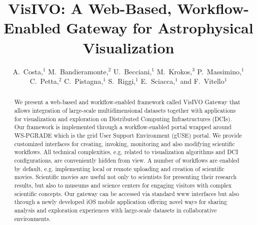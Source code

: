 
\resetcounters




\title{VisIVO: A Web-Based, Workflow-Enabled Gateway for Astrophysical Visualization}
\author{A.~Costa,$^1$ M.~Bandieramonte,$^2$ U.~Becciani,$^1$ M.~Krokos,$^3$ P.~Massimino,$^1$ C.~Petta,$^2$ C.~Pistagna,$^1$ S.~Riggi,$^1$ E.~Sciacca,$^1$ and F.~Vitello$^1$}


\begin{abstract}
We present a web-based and workflow-enabled framework called VisIVO Gateway that allows integration of large-scale multidimensional datasets together with applications for visualization and exploration on Distributed Computing Infrastructures (DCIs). Our framework is implemented through a workflow-enabled portal wrapped around WS-PGRADE which is the grid User Support Environment (gUSE) portal.  We provide customized interfaces for creating, invoking, monitoring and also modifying scientific workflows. All technical complexities, e.g. related to visualization algorithms and DCI configurations, are conveniently hidden from view. A number of workflows are enabled by default, e.g. implementing local or remote uploading and creation of scientific movies. Scientific movies are useful not only to scientists for presenting their research results, but also to museums and science centers for engaging visitors with complex scientific concepts. Our gateway can be accessed via standard www interfaces but also through a newly developed iOS mobile application offering novel ways for sharing analysis and exploration experiences with large-scale datasets in collaborative environments.
\end{abstract}

